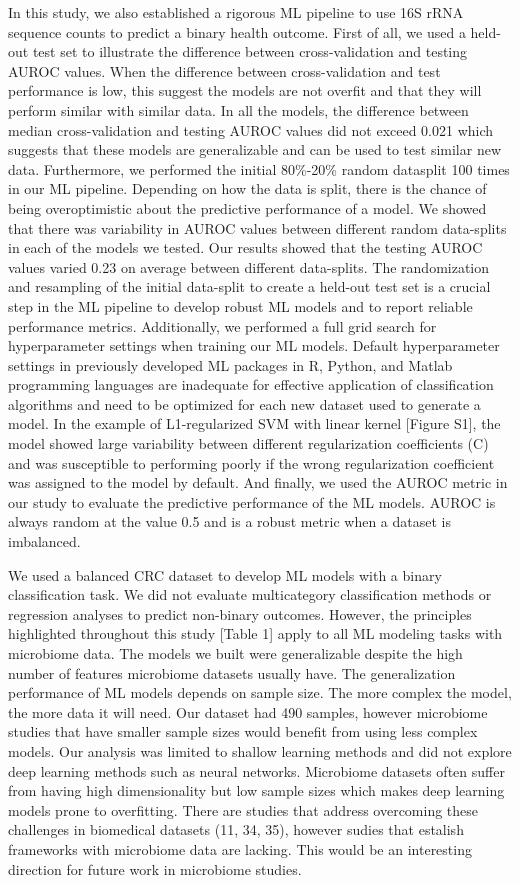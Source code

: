 \documentclass[11pt,]{article}
\begin{document}
In this study, we also established a rigorous ML pipeline to use 16S
rRNA sequence counts to predict a binary health outcome. First of all,
we used a held-out test set to illustrate the difference between
cross-validation and testing AUROC values. When the difference between
cross-validation and test performance is low, this suggest the models
are not overfit and that they will perform similar with similar data. In
all the models, the difference between median cross-validation and
testing AUROC values did not exceed 0.021 which suggests that these
models are generalizable and can be used to test similar new data.
Furthermore, we performed the initial 80\%-20\% random datasplit 100
times in our ML pipeline. Depending on how the data is split, there is
the chance of being overoptimistic about the predictive performance of a
model. We showed that there was variability in AUROC values between
different random data-splits in each of the models we tested. Our
results showed that the testing AUROC values varied 0.23 on average
between different data-splits. The randomization and resampling of the
initial data-split to create a held-out test set is a crucial step in
the ML pipeline to develop robust ML models and to report reliable
performance metrics. Additionally, we performed a full grid search for
hyperparameter settings when training our ML models. Default
hyperparameter settings in previously developed ML packages in R,
Python, and Matlab programming languages are inadequate for effective
application of classification algorithms and need to be optimized for
each new dataset used to generate a model. In the example of
L1-regularized SVM with linear kernel {[}Figure S1{]}, the model showed
large variability between different regularization coefficients (C) and
was susceptible to performing poorly if the wrong regularization
coefficient was assigned to the model by default. And finally, we used
the AUROC metric in our study to evaluate the predictive performance of
the ML models. AUROC is always random at the value 0.5 and is a robust
metric when a dataset is imbalanced.

We used a balanced CRC dataset to develop ML models with a binary
classification task. We did not evaluate multicategory classification
methods or regression analyses to predict non-binary outcomes. However,
the principles highlighted throughout this study {[}Table 1{]} apply to
all ML modeling tasks with microbiome data. The models we built were
generalizable despite the high number of features microbiome datasets
usually have. The generalization performance of ML models depends on
sample size. The more complex the model, the more data it will need. Our
dataset had 490 samples, however microbiome studies that have smaller
sample sizes would benefit from using less complex models. Our analysis
was limited to shallow learning methods and did not explore deep
learning methods such as neural networks. Microbiome datasets often
suffer from having high dimensionality but low sample sizes which makes
deep learning models prone to overfitting. There are studies that
address overcoming these challenges in biomedical datasets (11, 34, 35),
however sudies that estalish frameworks with microbiome data are
lacking. This would be an interesting direction for future work in
microbiome studies.
\end{document}
